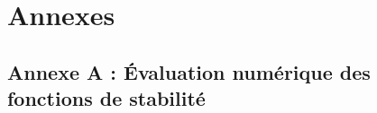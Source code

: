 \documentclass[11pt]{report}
\theoremstyle{definition}
\theoremstyle{remark}
\begin{document}
\newpage

\printbibliography
{}

\newpage

\appendix
\chapter*{Annexes}
\section*{Annexe A : Évaluation numérique des fonctions de stabilité}



\end{document}
